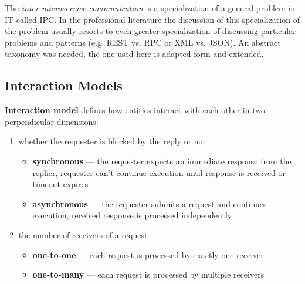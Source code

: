 \documentclass[thesis=M,english,hidelinks]{FITthesis}[2012/10/20]
\begin{document}
The \textit{inter-microservice communication} is a specialization of a general problem in \acrshort{IT} called \acrfull{IPC}. In the professional literature the discussion of this specialization of the problem usually resorts to even greater specialization of discussing particular problems and patterns (e.g. \acrshort{REST} vs. \acrshort{RPC} or \acrshort{XML} vs. \acrshort{JSON}). An abstract taxonomy was needed, the one used here is adapted form \cite{ms-taxonomy} and extended.



\subsection{Interaction Models}

\textbf{Interaction model} defines how entities interact with each other in two perpendicular dimensions:
\begin{enumerate}
    \item whether the requester is blocked by the reply or not
    \begin{itemize}
        \item \textbf{synchronous} --- the requester expects an immediate response from the replier, requester can't continue execution until response is received or timeout expires
        \item \textbf{asynchronous} --- the requester submits a request and continues execution, received response is processed independently
    \end{itemize}
    
    \item the number of receivers of a request
    \begin{itemize}
        \item \textbf{one-to-one} ---  each request is processed by exactly one receiver
        \item \textbf{one-to-many} --- each request is processed by multiple receivers
    \end{itemize}
\end{enumerate}
\end{document}

